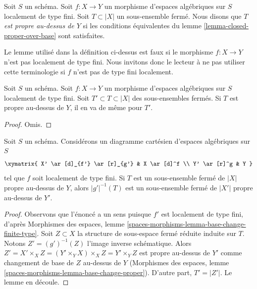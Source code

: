\begin{definition}
\label{definition-proper-over-base}
Soit $S$ un schéma.
Soit $f : X \to Y$ un morphisme d'espaces algébriques sur $S$
localement de type fini.
Soit $T \subset |X|$ un sous-ensemble fermé.
Nous disons que {\it $T$ est propre au-dessus de $Y$}
si les conditions équivalentes du lemme \ref{lemma-closed-proper-over-base}
sont satisfaites.
\end{definition}

\noindent
Le lemme utilisé dans la définition ci-dessus est faux si le morphisme
$f : X \to Y$ n'est pas localement de type fini. Nous invitons donc
le lecteur à ne pas utiliser cette terminologie si $f$ n'est pas de
type fini localement.

\begin{lemma}
\label{lemma-closed-closed-proper-over-base}
Soit $S$ un schéma.
Soit $f : X \to Y$ un morphisme d'espaces algébriques sur $S$
localement de type fini.
Soit $T' \subset T \subset |X|$ des sous-ensembles fermés.
Si $T$ est propre au-dessus de $Y$, il en va de même pour $T'$.
\end{lemma}

\begin{proof}
Omis.
\end{proof}

\begin{lemma}
\label{lemma-base-change-closed-proper-over-base}
Soit $S$ un schéma.
Considérons un diagramme cartésien d'espaces algébriques sur $S$
$$
\xymatrix{
X' \ar[d]_{f'} \ar[r]_{g'} & X \ar[d]^f \\
Y' \ar[r]^g & Y
}
$$
tel que $f$ soit localement de type fini.
Si $T$ est un sous-ensemble fermé de $|X|$ propre au-dessus de $Y$, alors
$|g'|^{-1}(T)$ est un sous-ensemble fermé de $|X'|$ propre au-dessus de $Y'$.
\end{lemma}

\begin{proof}
Observons que l'énoncé a un sens puisque $f'$ est localement de
type fini, d'après Morphismes des espaces, lemme
\ref{spaces-morphisms-lemma-base-change-finite-type}.
Soit $Z \subset X$ la structure de sous-espace fermé réduite induite sur $T$.
Notons $Z' = (g')^{-1}(Z)$ l'image inverse schématique.
Alors $Z' = X' \times_X Z = (Y' \times_Y X) \times_X Z = Y' \times_Y Z$
est propre au-dessus de $Y'$ comme changement de base de $Z$ au-dessus de $Y$
(Morphismes des espaces, lemme \ref{spaces-morphisms-lemma-base-change-proper}).
D'autre part, $T' = |Z'|$. Le lemme en découle.
\end{proof}

